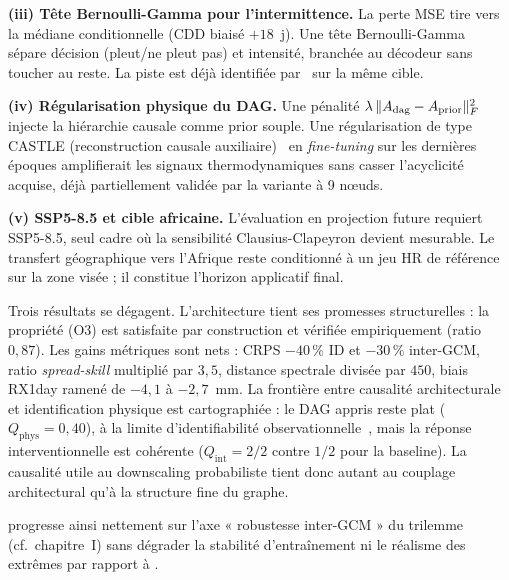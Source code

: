 \textbf{(iii) Tête Bernoulli-Gamma pour l'intermittence.} La perte MSE tire vers la médiane conditionnelle (CDD biaisé $+18$~j). Une tête Bernoulli-Gamma~\cite{maraun_widmann_2018} sépare décision (pleut/ne pleut pas) et intensité, branchée au décodeur sans toucher au reste. La piste est déjà identifiée par~\cite{rampal_cgan_2024} sur la même cible.

\textbf{(iv) Régularisation physique du DAG.} Une pénalité $\lambda \, \|A_{\mathrm{dag}} - A_{\mathrm{prior}}\|_F^2$ injecte la hiérarchie causale comme prior souple. Une régularisation de type CASTLE (reconstruction causale auxiliaire)~\cite{kyono_castle_2020} en \emph{fine-tuning} sur les dernières époques amplifierait les signaux thermodynamiques sans casser l'acyclicité acquise, déjà partiellement validée par la variante à 9 nœuds.

\textbf{(v) SSP5-8.5 et cible africaine.} L'évaluation en projection future requiert SSP5-8.5, seul cadre où la sensibilité Clausius-Clapeyron devient mesurable. Le transfert géographique vers l'Afrique reste conditionné à un jeu HR de référence sur la zone visée ; il constitue l'horizon applicatif final.

\label{sec:exp-synthese}

Trois résultats se dégagent. L'architecture tient ses promesses structurelles : la propriété (O3) est satisfaite par construction et vérifiée empiriquement (ratio $0{,}87$). Les gains métriques sont nets : CRPS $-40\,\%$ ID et $-30\,\%$ inter-GCM, ratio \emph{spread-skill} multiplié par $3{,}5$, distance spectrale divisée par $450$, biais RX1day ramené de $-4{,}1$ à $-2{,}7$~mm. La frontière entre causalité architecturale et identification physique est cartographiée : le DAG appris reste plat ($Q_{\mathrm{phys}}=0{,}40$), à la limite d'identifiabilité observationnelle~\cite{pearl_causality_2009}, mais la réponse interventionnelle est cohérente ($Q_{\mathrm{int}}=2/2$ contre $1/2$ pour la baseline). La causalité utile au downscaling probabiliste tient donc autant au couplage architectural qu'à la structure fine du graphe.

\Oracle{} progresse ainsi nettement sur l'axe « robustesse inter-GCM » du trilemme (cf.~chapitre~I) sans dégrader la stabilité d'entraînement ni le réalisme des extrêmes par rapport à \CorrDiff{}.

\iffalse
